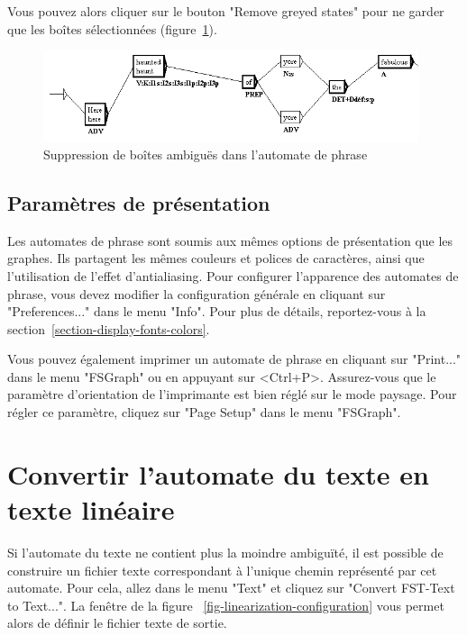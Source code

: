 \bigskip
\noindent Vous pouvez alors cliquer sur le bouton "Remove greyed states" pour ne garder que les
boîtes sélectionnées (figure~\ref{fig-removed-ambiguities}).

\begin{figure}[!ht]
\begin{center}
\includegraphics[width=11cm]{resources/img/fig7-24c.png}
\caption{Suppression de boîtes ambiguës dans l'automate de phrase
\label{fig-removed-ambiguities}}
\end{center}
\end{figure}

\bigskip
\noindent



\subsection{Paramètres de présentation}
Les automates de phrase sont soumis aux mêmes options de présentation que les graphes.
Ils partagent les mêmes couleurs et polices de caractères, ainsi que l’utilisation de l’effet
d’antialiasing. Pour configurer l’apparence des automates de phrase, vous devez modifier
la configuration générale en cliquant sur "Preferences..." dans le menu "Info". Pour plus de
détails, reportez-vous à la section~\ref{section-display-fonts-colors}.

\bigskip
\noindent Vous pouvez également imprimer un automate de phrase en cliquant sur "Print..." dans
le menu "FSGraph" ou en appuyant sur <Ctrl+P>. Assurez-vous que le paramètre d’orientation de 
l’imprimante est bien réglé sur le mode paysage. 
Pour régler ce paramètre, cliquez sur "Page Setup" dans le menu "FSGraph".


\section{Convertir l’automate du texte en texte linéaire}
\label{section-linear-text}
    Si l’automate du texte ne contient plus la moindre ambiguïté, il est possible de construire
un fichier texte correspondant à l’unique chemin représenté par cet automate. Pour cela,
allez dans le menu "Text" et cliquez sur "Convert FST-Text to Text...". La fenêtre de la figure
~\ref{fig-linearization-configuration} vous permet alors de définir le fichier texte de sortie.

